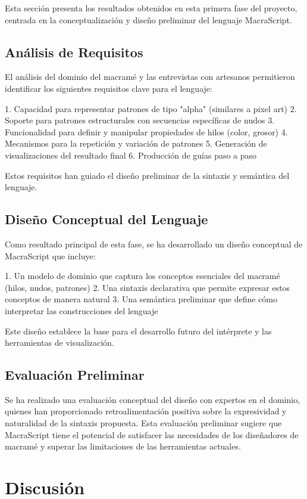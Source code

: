 \documentclass[12pt,a4paper]{report}
\begin{document}
Esta sección presenta los resultados obtenidos en esta primera fase del proyecto, centrada en la conceptualización y diseño preliminar del lenguaje MacraScript.

\section{Análisis de Requisitos}
El análisis del dominio del macramé y las entrevistas con artesanos permitieron identificar los siguientes requisitos clave para el lenguaje:

1. Capacidad para representar patrones de tipo "alpha" (similares a pixel art)
2. Soporte para patrones estructurales con secuencias específicas de nudos
3. Funcionalidad para definir y manipular propiedades de hilos (color, grosor)
4. Mecanismos para la repetición y variación de patrones
5. Generación de visualizaciones del resultado final
6. Producción de guías paso a paso

Estos requisitos han guiado el diseño preliminar de la sintaxis y semántica del lenguaje.

\section{Diseño Conceptual del Lenguaje}
Como resultado principal de esta fase, se ha desarrollado un diseño conceptual de MacraScript que incluye:

1. Un modelo de dominio que captura los conceptos esenciales del macramé (hilos, nudos, patrones)
2. Una sintaxis declarativa que permite expresar estos conceptos de manera natural
3. Una semántica preliminar que define cómo interpretar las construcciones del lenguaje

Este diseño establece la base para el desarrollo futuro del intérprete y las herramientas de visualización.

\section{Evaluación Preliminar}
Se ha realizado una evaluación conceptual del diseño con expertos en el dominio, quienes han proporcionado retroalimentación positiva sobre la expresividad y naturalidad de la sintaxis propuesta. Esta evaluación preliminar sugiere que MacraScript tiene el potencial de satisfacer las necesidades de los diseñadores de macramé y superar las limitaciones de las herramientas actuales.

\chapter{Discusión}
\end{document}
